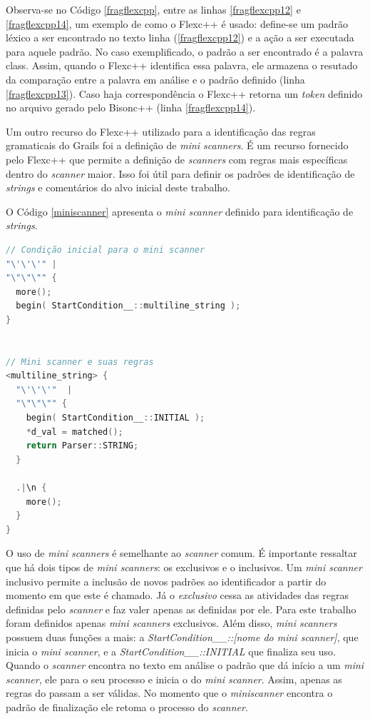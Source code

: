 Observa-se no Código \ref{fragflexcpp}, entre as linhas \ref{fragflexcpp12} e \ref{fragflexcpp14}, um exemplo de como o \textsf{Flexc++} é usado:
define-se um padrão léxico a ser encontrado no texto linha (\ref{fragflexcpp12}) e
a ação a ser executada para aquele padrão. No caso exemplificado, o
padrão a ser encontrado é a palavra \textsf{class}. Assim, quando o Flexc++
identifica essa palavra, ele armazena o resutado da comparação entre a palavra em
análise e o padrão definido (linha \ref{fragflexcpp13}). Caso haja correspondência o
Flexc++ retorna um \textit{token} definido no arquivo gerado pelo
\textsf{Bisonc++} (linha \ref{fragflexcpp14}).

Um outro recurso do \textsf{Flexc++} utilizado para a identificação das regras
gramaticais do \textsf{Grails} foi a definição de \textit{mini scanners}. É um
recurso fornecido pelo \textsf{Flexc++} que permite a definição de \textit{scanners}
com regras mais específicas dentro do \textit{scanner} maior. Isso foi útil para
definir os padrões de identificação de \textit{strings} e comentários do alvo inicial deste trabalho.

O Código \ref{miniscanner} apresenta o \textit{mini scanner} definido para
identificação de \textit{strings}.

\begin{lstlisting}[language=C++, label=miniscanner, caption=Implementação do mini scanner de strings]
// Condição inicial para o mini scanner
"\'\'\'" |
"\"\"\"" {
  more();
  begin( StartCondition__::multiline_string );
}


// Mini scanner e suas regras
<multiline_string> {
  "\'\'\'"  |
  "\"\"\"" {
    begin( StartCondition__::INITIAL );
    *d_val = matched();
    return Parser::STRING;
  }

  .|\n {
    more();
  }
}
\end{lstlisting}

O uso de \textit{mini scanners} é semelhante ao \textit{scanner} comum. É
importante ressaltar que há dois tipos de \textit{mini scanners}: os exclusivos
e o inclusivos. Um \textit{mini scanner} inclusivo permite a inclusão de novos
padrões ao identificador a partir do momento em que este é chamado. Já o
\textit{exclusivo} cessa as atividades das regras definidas pelo \textit{scanner}
e faz valer apenas as definidas por ele. Para este trabalho foram definidos apenas
\textit{mini scanners} exclusivos. Além disso, \textit{mini scanners} possuem
duas funções a mais: a \textit{StartCondition\_\_::[nome do mini scanner]}, que
inicia o \textit{mini scanner}, e a \textit{StartCondition\_\_::INITIAL} que
finaliza seu uso. Quando o \textit{scanner} encontra no texto em análise o
padrão que dá início a um \textit{mini scanner}, ele para o seu processo e
inicia o do \textit{mini scanner}. Assim, apenas as regras do \miniscanner passam a ser
válidas. No momento que o \textit{miniscanner} encontra o padrão de finalização
ele retoma o processo do \textit{scanner}.

